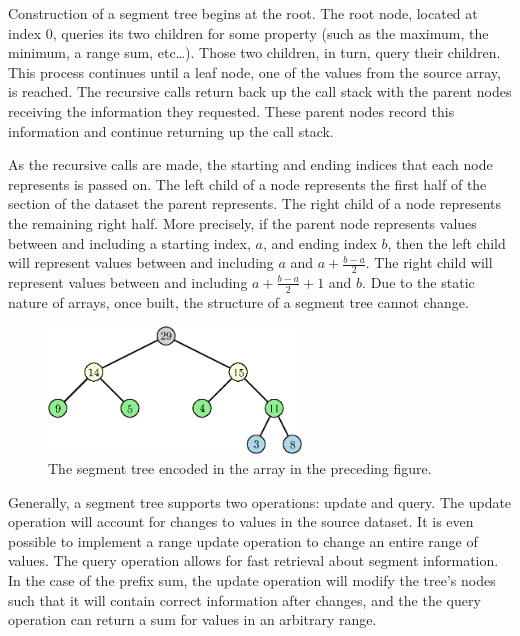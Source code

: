 Construction of a segment tree begins at the root.
The root node, located at index 0, queries its two children for some property (such as the maximum, the minimum, a range sum, etc\ldots).
Those two children, in turn, query their children.
This process continues until a leaf node, one of the values from the source array, is reached.
The recursive calls return back up the call stack with the parent nodes receiving the information they requested.
These parent nodes record this information and continue returning up the call stack.

As the recursive calls are made, the starting and ending indices that each node represents is passed on.
The left child of a node represents the first half of the section of the dataset the parent represents.
The right child of a node represents the remaining right half.
More precisely, if the parent node represents values between and including a starting index, $a$, and ending index $b$, then the left child will represent values between and including $a$ and $a + \frac{b - a}{2}$.
The right child will represent values between and including $a + \frac{b - a}{2} + 1$ and $b$.
Due to the static nature of arrays, once built, the structure of a segment tree cannot change.

\begin{figure}[h]
    \centering
    \includegraphics[width=0.6\textwidth]{./structures/segment-tree/tree-visual}
    \caption{\small The segment tree encoded in the array in the preceding figure.}
\end{figure}







Generally, a segment tree supports two operations: update and query.
The update operation will account for changes to values in the source dataset.
It is even possible to implement a range update operation to change an entire range of values.
The query operation allows for fast retrieval about segment information.
In the case of the prefix sum, the update operation will modify the tree's nodes such that it will contain correct information after changes, and the the query operation can return a sum for values in an arbitrary range.

